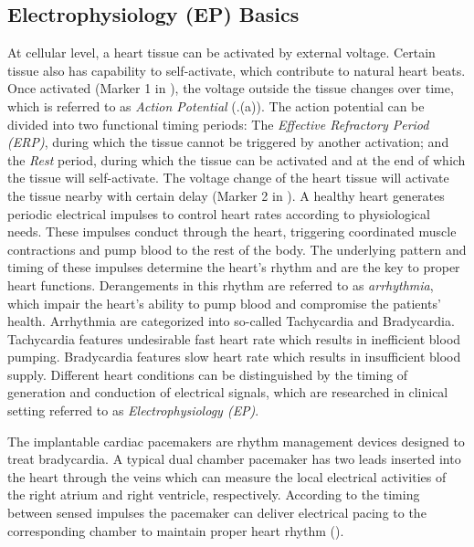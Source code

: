 \subsection{Electrophysiology (EP) Basics}
At cellular level, a heart tissue can be activated by external voltage. Certain tissue also has capability to self-activate, which contribute to natural heart beats. Once activated (Marker 1 in ), the voltage outside the tissue changes over time, which is referred to as \emph{Action Potential} (.(a)). The action potential can be divided into two functional timing periods: The \emph{Effective Refractory Period (ERP)}, during which the tissue cannot be triggered by another activation; and the \emph{Rest} period, during which the tissue can be activated and at the end of which the tissue will self-activate. The voltage change of the heart tissue will activate the tissue nearby with certain delay (Marker 2 in ).  A healthy heart generates periodic electrical impulses to control heart rates according to physiological needs. These impulses conduct through the heart, triggering coordinated muscle contractions and pump blood to the rest of the body. The underlying pattern and timing of these impulses determine the heart's rhythm and are the key to proper heart functions. Derangements in this rhythm are referred to as \emph{arrhythmia}, which impair the heart's ability to pump blood and compromise the patients' health. Arrhythmia are categorized into so-called \textsf{Tachycardia} and \textsf{Bradycardia}. Tachycardia features undesirable fast heart rate which results in inefficient blood pumping. Bradycardia features slow heart rate which results in insufficient blood supply.
Different heart conditions can be distinguished by the timing of generation and conduction of electrical signals, which are researched in clinical setting referred to as \emph{Electrophysiology (EP)}\cite{josephson}.

The implantable cardiac pacemakers are rhythm management devices designed to treat bradycardia. A typical dual chamber pacemaker has two leads inserted into the heart through the veins which can measure the local electrical activities of the right atrium and right ventricle, respectively. According to the timing between sensed impulses the pacemaker can deliver electrical pacing to the corresponding chamber to maintain proper heart rhythm ().  

